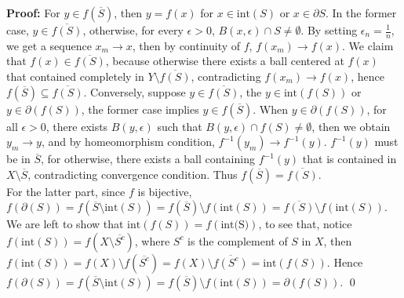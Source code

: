 \documentclass[12pt]{article}
\begin{document}
\textbf{Proof:} For $y\in f(\overline{S})$, then $y = f(x)$ for $x\in \text{int}(S)$ or $x\in \partial S$. In the former case, $y\in \overline{f(S)}$, otherwise, for every $\epsilon >0$, $B(x, \epsilon)\cap S\neq\emptyset$. By setting $\epsilon_{n} = \frac{1}{n}$, we get a sequence $x_{m}\to x$, then by continuity of $f$, $f(x_{m})\to f(x)$. We claim that $f(x)\in \overline{f(S)}$, because otherwise there exists a ball centered at $f(x)$ that contained completely in $Y\setminus \overline{f(S)}$, contradicting $f(x_{m})\to f(x)$, hence $f(\overline{S})\subseteq \overline{f(S)}$. Conversely, suppose $y\in \overline{f(S)}$, the $y\in \text{int}(f(S))$ or $y\in \partial(f(S))$, the former case implies $y\in f(\overline{S})$. When $y\in \partial(f(S))$, for all $\epsilon >0$, there exists $B(y, \epsilon)$ such that $B(y, \epsilon)\cap f(S)\neq\emptyset$, then we obtain $y_{m}\to y$, and by homeomorphism condition, $f^{-1}(y_{m})\to f^{-1}(y)$. $f^{-1}(y)$ must be in $\overline{S}$, for otherwise, there exists a ball containing $f^{-1}(y)$ that is contained in $X\setminus \overline{S}$, contradicting convergence condition. Thus $f(\overline{S})=\overline{f(S)}$. \\
\indent For the latter part, since $f$ is bijective, $f(\partial(S))=f(\overline{S}\setminus\text{int}(S))=f(\overline{S})\setminus f(\text{int}(S))=\overline{f(S)}\setminus f(\text{int}(S))$. We are left to show that $\text{int}(f(S))=f(\text{int(S)})$, to see that, notice $f(\text{int}(S))=f(X\setminus \overline{S^{c}})$, where $S^{c}$ is the complement of $S$ in $X$, then $f(\text{int}(S))=f(X)\setminus f(\overline{S^{c}})=f(X)\setminus \overline{f(S^{c})}=\text{int}(f(S))$. Hence $f(\partial(S))=f(\overline{S}\setminus\text{int}(S))=f(\overline{S})\setminus f(\text{int}(S))=\partial(f(S))$. \qed
\end{document}
